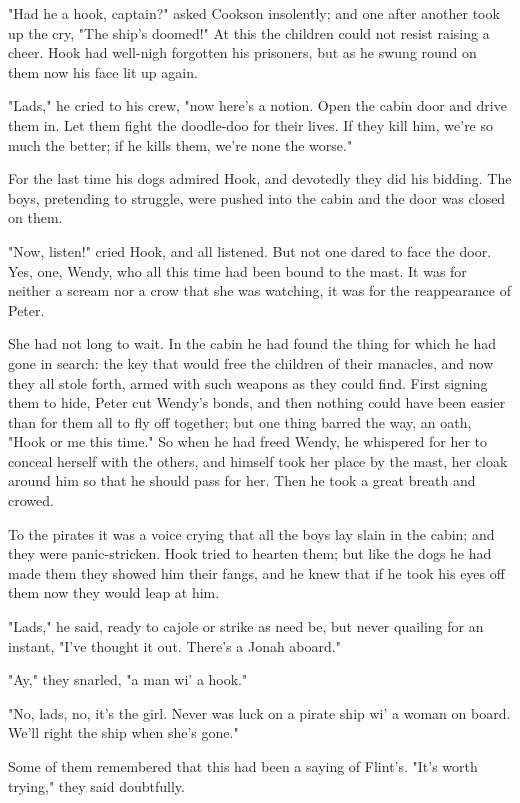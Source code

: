 "Had he a hook, captain?" asked Cookson insolently; and one after another
took up the cry, "The ship's doomed!" At this the children could not
resist raising a cheer. Hook had well-nigh forgotten his prisoners, but as
he swung round on them now his face lit up again.


"Lads," he cried to his crew, "now here's a notion. Open the cabin door
and drive them in. Let them fight the doodle-doo for their lives. If they
kill him, we're so much the better; if he kills them, we're none the
worse."


For the last time his dogs admired Hook, and devotedly they did his
bidding. The boys, pretending to struggle, were pushed into the cabin and
the door was closed on them.


"Now, listen!" cried Hook, and all listened. But not one dared to face the
door. Yes, one, Wendy, who all this time had been bound to the mast. It
was for neither a scream nor a crow that she was watching, it was for the
reappearance of Peter.


She had not long to wait. In the cabin he had found the thing for which he
had gone in search: the key that would free the children of their
manacles, and now they all stole forth, armed with such weapons as they
could find. First signing them to hide, Peter cut Wendy's bonds, and then
nothing could have been easier than for them all to fly off together; but
one thing barred the way, an oath, "Hook or me this time." So when he had
freed Wendy, he whispered for her to conceal herself with the others, and
himself took her place by the mast, her cloak around him so that he should
pass for her. Then he took a great breath and crowed.


To the pirates it was a voice crying that all the boys lay slain in the
cabin; and they were panic-stricken. Hook tried to hearten them; but like
the dogs he had made them they showed him their fangs, and he knew that if
he took his eyes off them now they would leap at him.


"Lads," he said, ready to cajole or strike as need be, but never quailing
for an instant, "I've thought it out. There's a Jonah aboard."


"Ay," they snarled, "a man wi' a hook."


"No, lads, no, it's the girl. Never was luck on a pirate ship wi' a woman
on board. We'll right the ship when she's gone."


Some of them remembered that this had been a saying of Flint's. "It's
worth trying," they said doubtfully.


